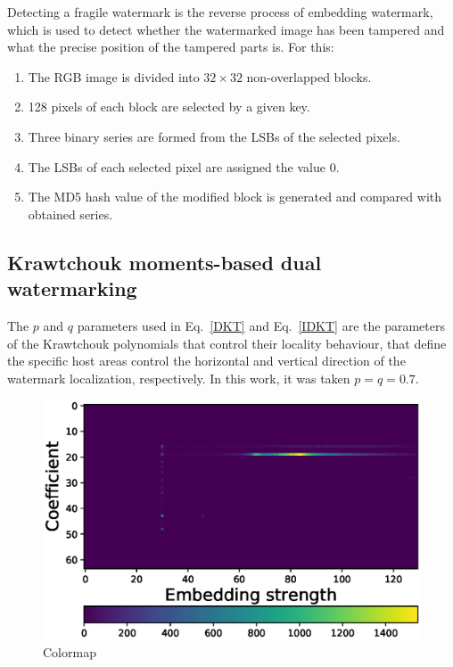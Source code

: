 \documentclass[runningheads]{llncs}
\begin{document}
Detecting a fragile watermark is the reverse process of embedding watermark, which is used to detect whether the watermarked image has been tampered and what the precise position of the tampered parts is. For this:
\begin{enumerate}
	\item The RGB image is divided into $32\times 32$ non-overlapped blocks.
	\item 128 pixels of each block are selected by a given key.
	\item Three binary series are formed from the LSBs of the selected pixels.
	\item The LSBs of each selected pixel are assigned the value 0.
	\item The MD5 hash value of the modified block is generated and compared with obtained series.
\end{enumerate}

\subsection{Krawtchouk moments-based dual watermarking}
The $p$ and $q$ parameters used in Eq.~\ref{DKT} and Eq.~\ref{IDKT} are the parameters of the Krawtchouk polynomials that control their locality behaviour, that define the specific host areas control the horizontal and vertical direction of the watermark localization, respectively. In this work, it was taken $p=q=0.7$.
\begin{figure} [H]
	\begin{center}
		\includegraphics[width=\textwidth]{colormapDKT.eps}
	\end{center}
	\caption{Colormap}
	\label{colormapDKT}
\end{figure}
\end{document}
